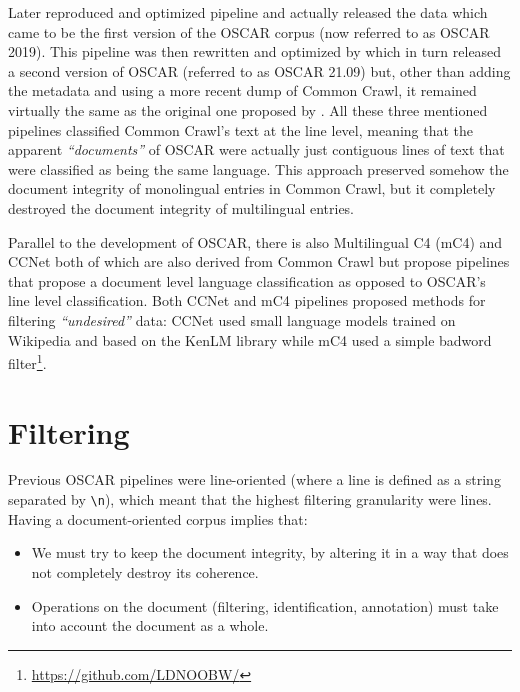 Later  reproduced and optimized  pipeline and actually released the data which came to be the first version of the OSCAR corpus (now referred to as OSCAR 2019). This pipeline was then rewritten and optimized by  which in turn released a second version of OSCAR (referred to as OSCAR 21.09) but, other than adding the metadata and using a more recent dump of Common Crawl, it remained virtually the same as the original one proposed by . All these three mentioned pipelines \cite{grave-etal-2018-learning,ortiz-suarez-etal-2019-asynchronous,abadji-etal-2021-ungoliant} classified Common Crawl's text at the line level, meaning that the apparent \emph{``documents''} of OSCAR were actually just contiguous lines of text that were classified as being the same language. This approach preserved somehow the document integrity of monolingual entries in Common Crawl, but it completely destroyed the document integrity of multilingual entries.

Parallel to the development of OSCAR, there is also Multilingual C4 (mC4) \cite{xue-etal-2021-mt5} and CCNet \cite{wenzek-etal-2020-ccnet} both of which are also derived from Common Crawl but propose pipelines that propose a document level language classification as opposed to OSCAR's line level classification. Both CCNet and mC4 pipelines proposed methods for filtering \emph{``undesired''} data: CCNet used small language models trained on Wikipedia and based on the KenLM library \cite{heafield-2011-kenlm} while mC4 used a simple badword filter\footnote{\url{https://github.com/LDNOOBW/}}.

\section{Filtering}

Previous OSCAR pipelines were line-oriented (where a line is defined as a string separated by \texttt{\textbackslash n}), which meant that the highest filtering granularity were lines.
Having a document-oriented corpus implies that:
\begin{itemize}
    \item We must try to keep the document integrity, by altering it in a way that does not completely destroy its coherence.
    \item Operations on the document (filtering, identification, annotation) must take into account the document as a whole.
\end{itemize}

